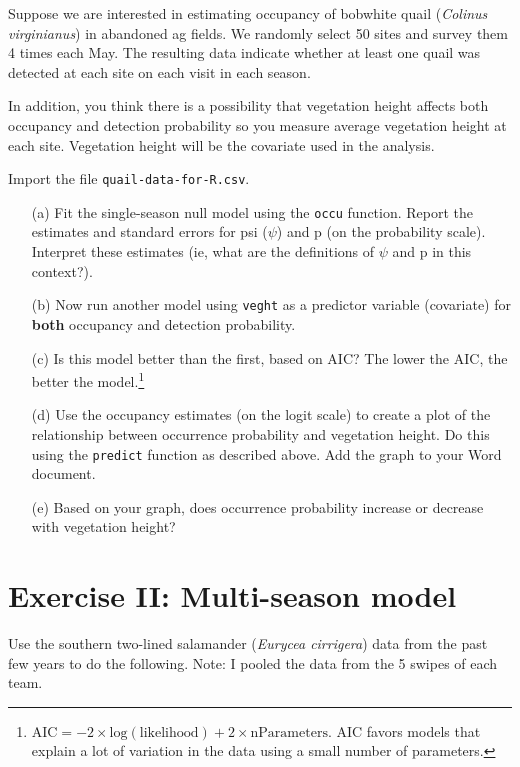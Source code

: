 \documentclass[12pt]{article}\usepackage[]{graphicx}\usepackage[]{xcolor}
\begin{document}
Suppose we are interested in estimating occupancy of bobwhite quail
({\it Colinus virginianus}) in abandoned ag fields. We randomly select
50 sites and survey them 4 times each May. The resulting data indicate
whether at least one quail was detected at each site on each visit in
each season.    

In addition, you think there is a possibility that vegetation height
affects both occupancy and detection probability so you measure
average vegetation height at each site. Vegetation height will be the
covariate used in the analysis. 

Import the file {\tt quail-data-for-R.csv}.

\begin{enumerate}
  \item[(a)] Fit the single-season null model using the \texttt{occu} 
    function. Report the estimates and standard errors for psi
    ($\psi$) and p (on the probability scale). Interpret 
    these estimates (ie, what are the definitions of $\psi$ and p in this
    context?). 
  \item[(b)] Now run another model using \texttt{veght} as a
    predictor variable (covariate) for {\bf both} occupancy and detection
    probability. 
  \item[(c)] Is this model better than the first, based on AIC? The
    lower the AIC, the better the model.\footnote{$\mathrm{AIC} =
      -2\times \mathrm{log(likelihood)} + 2\times \mathrm{nParameters}$. AIC
      favors models that explain a lot of variation in the data using
      a small number of parameters.}  
  \item[(d)] Use the occupancy estimates (on the logit scale) to
    create a plot of the relationship between occurrence probability
    and vegetation height. Do this using the \texttt{predict} function
    as described above. Add the graph to your Word document.
  \item[(e)] Based on your graph, does occurrence probability
    increase or decrease with vegetation height?  
\end{enumerate}

\clearpage

\section*{Exercise II: Multi-season model}

Use the southern two-lined salamander ({\it Eurycea cirrigera})
data from the past few years to do the following. Note: I pooled the
data from the 5 swipes of each team.
\end{document}
